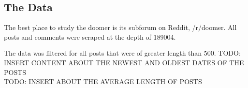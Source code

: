 \documentclass[../report.tex]{subfiles}
\begin{document}
\subsection{The Data}
The best place to study the doomer is its subforum on Reddit, /r/doomer.
All posts and comments were scraped at the depth of 189004.


The data was filtered for all posts that were of greater length than 500. 
TODO: INSERT CONTENT ABOUT THE NEWEST AND OLDEST DATES OF THE POSTS \\
TODO: INSERT ABOUT THE AVERAGE LENGTH OF POSTS \\
\end{document}
